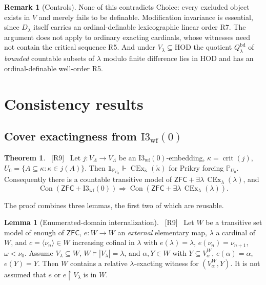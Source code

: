 \documentclass[11pt,letterpaper]{article}
\theoremstyle{definition}
\newtheorem{theorem}[definition]{Theorem}
\newtheorem{lemma}[definition]{Lemma}
\newtheorem{remark}[definition]{Remark}
\numberwithin{equation}{section}
\newcommand{\ZFC}{\mathsf{ZFC}}
\newcommand{\HOD}{\mathrm{HOD}}
\newcommand{\CEx}{\operatorname{CEx}}
\newcommand{\Con}{\operatorname{Con}}
\newcommand{\crit}{\operatorname{crit}}
\newcommand{\restr}{\mathbin{\upharpoonright}}
\newcommand{\Iwf}{\mathrm{I3}_{\mathrm{wf}}(0)}
\newcommand{\PP}{\mathbb P}
\newcommand{\src}[1]{\unskip\ {\normalfont\small\sffamily\color{Olive}[#1]}\ }
\newcommand{\R}[1]{\textsf{R#1}}
\begin{document}
\begin{remark}[Controls]\label{rem:controls}
None of this contradicts Choice: every excluded object exists in $V$ and merely fails to be definable. Modification invariance is essential, since $D_\lambda$ itself carries an ordinal-definable lexicographic linear order \R7. The argument does not apply to ordinary exacting cardinals, whose witnesses need not contain the critical sequence \R5. And under $V_\lambda\subseteq\HOD$ the quotient $Q^{\mathrm{bd}}_\lambda$ of \emph{bounded} countable subsets of $\lambda$ modulo finite difference lies in $\HOD$ and has an ordinal-definable well-order \R5.
\end{remark}

\section{Consistency results}\label{sec:cons}

\subsection{Cover exactingness from \texorpdfstring{$\Iwf$}{I3wf(0)}}\label{sec:i3}

\begin{theorem}\label{thm:i3}\src{R9}
Let $j:V_\Lambda\to V_\Lambda$ be an $\Iwf$-embedding, $\kappa=\crit(j)$, $U_0=\{A\subseteq\kappa:\kappa\in j(A)\}$. Then $\mathbf 1_{\PP_{U_0}}\Vdash\CEx_{\check\kappa}(\check\kappa)$ for Prikry forcing $\PP_{U_0}$. Consequently there is a countable transitive model of $\ZFC+\exists\lambda\,\CEx_\lambda(\lambda)$, and
\[
\Con(\ZFC+\Iwf)\Longrightarrow\Con(\ZFC+\exists\lambda\,\CEx_\lambda(\lambda)).
\]
\end{theorem}

The proof combines three lemmas, the first two of which are reusable.

\begin{lemma}[Enumerated-domain internalization]\label{lem:internal}\src{R9}
Let $W$ be a transitive set model of enough of $\ZFC$, $e:W\to W$ an \emph{external} elementary map, $\lambda$ a cardinal of $W$, and $c=\langle\nu_n\rangle\in W$ increasing cofinal in $\lambda$ with $e(\lambda)=\lambda$, $e(\nu_n)=\nu_{n+1}$, $\omega<\nu_0$. Assume $V_\lambda\subseteq W$, $W\models|V_\lambda|=\lambda$, and $\alpha,Y\in W$ with $Y\subseteq V^W_\alpha$, $e(\alpha)=\alpha$, $e(Y)=Y$. Then $W$ contains a relative $\lambda$-exacting witness for $(V_\alpha^W,Y)$. It is not assumed that $e$ or $e\restr V_\lambda$ is in $W$.
\end{lemma}
\end{document}
